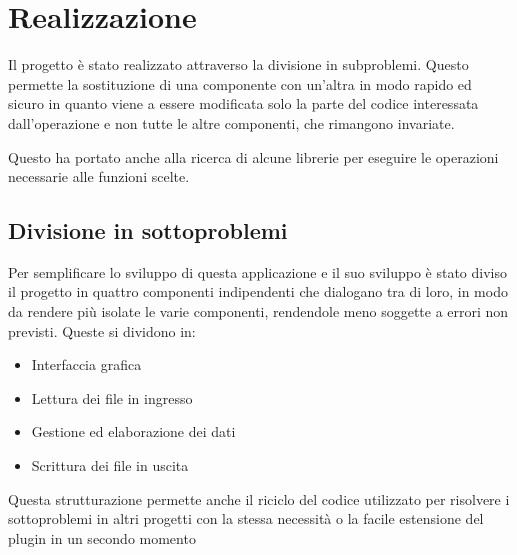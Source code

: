 
\chapter{Realizzazione}
\label{cap:realizzazione}

Il progetto è stato realizzato attraverso la divisione in subproblemi. Questo permette la sostituzione di una componente con un'altra in modo rapido ed sicuro in quanto viene a essere modificata solo la parte del codice interessata dall'operazione e non tutte le altre componenti, che rimangono invariate.

Questo ha portato anche alla ricerca di alcune librerie per eseguire le operazioni necessarie alle funzioni scelte.

\section{Divisione in sottoproblemi}
Per semplificare lo sviluppo di questa applicazione e il suo sviluppo è stato diviso il progetto in quattro componenti indipendenti che dialogano tra di loro, in modo da rendere più isolate le varie componenti, rendendole meno soggette a errori non previsti.
Queste si dividono in:
\begin{itemize}
\item Interfaccia grafica
\item Lettura dei file in ingresso
\item Gestione ed elaborazione dei dati
\item Scrittura dei file in uscita
\end{itemize}

Questa strutturazione permette anche il riciclo del codice utilizzato per risolvere i sottoproblemi in altri progetti con la stessa necessità o la facile estensione del plugin in un secondo momento

